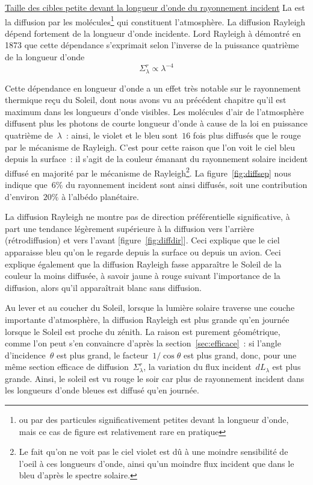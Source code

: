 \begin{finger}
\item \underline{Taille des cibles petite devant la longueur d'onde du rayonnement incident} La  est la diffusion par les molécules\footnote{ou par des particules significativement petites devant la longueur d'onde, mais ce cas de figure est relativement rare en pratique} qui constituent l'atmosphère. La diffusion Rayleigh dépend fortement de la longueur d’onde incidente. Lord Rayleigh à démontré en 1873 que cette dépendance s’exprimait selon l'inverse de la puissance quatrième de la longueur d'onde
\[ \boxed{ \Sigma_\lambda^r \propto \lambda^{-4} } \]
\begin{citemize}
\item Cette dépendance en longueur d'onde a un effet très notable sur le rayonnement thermique reçu du Soleil, dont nous avons vu au précédent chapitre qu'il est maximum dans les longueurs d'onde visibles. Les molécules d'air de l'atmosphère diffusent plus les photons de courte longueur d'onde à cause de la loi en puissance quatrième de~$\lambda$~: ainsi, le violet et le bleu sont~$16$ fois plus diffusés que le rouge par le mécanisme de Rayleigh. C'est pour cette raison que l'on voit le ciel bleu depuis la surface~: il s'agit de la couleur émanant du rayonnement solaire incident diffusé en majorité par le mécanisme de Rayleigh\footnote{Le fait qu'on ne voit pas le ciel violet est dû à une moindre sensibilité de l'oeil à ces longueurs d'onde, ainsi qu'un moindre flux incident que dans le bleu d'après le spectre solaire.}. La figure~\ref{fig:diffsep} nous indique que~$6\%$ du rayonnement incident sont ainsi diffusés, soit une contribution d'environ~$20\%$ à l'albédo planétaire. 
\item La diffusion Rayleigh ne montre pas de direction préférentielle significative, à part une tendance légèrement supérieure à la diffusion vers l'arrière (rétrodiffusion) et vers l'avant [figure~\ref{fig:diffdir}]. Ceci explique que le ciel apparaisse bleu qu'on le regarde depuis la surface ou depuis un avion. Ceci explique également que la diffusion Rayleigh fasse apparaître le Soleil de la couleur la moins diffusée, à savoir jaune à rouge suivant l'importance de la diffusion, alors qu'il apparaîtrait blanc sans diffusion.
\item Au lever et au coucher du Soleil, lorsque la lumière solaire traverse une couche importante d'atmosphère, la diffusion Rayleigh est plus grande qu'en journée lorsque le Soleil est proche du zénith. La raison est purement géométrique, comme l'on peut s'en convaincre d'après la section~\ref{sec:efficace}~: si l'angle d'incidence~$\theta$ est plus grand, le facteur~$1/\cos\theta$ est plus grand, donc, pour une même section efficace de diffusion~$\Sigma_\lambda^r$, la variation du flux incident~$dL_\lambda$ est plus grande. Ainsi, le soleil est vu rouge le soir car plus de rayonnement incident dans les longueurs d'onde bleues est diffusé qu'en journée.

\end{citemize}
\end{finger}

